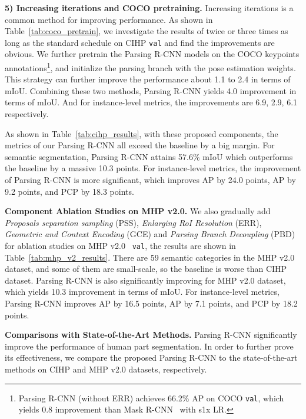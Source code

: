 \documentclass[10pt,twocolumn,letterpaper]{article}
\begin{document}
\vspace{3pt}
\noindent\textbf{5) Increasing iterations and COCO pretraining.} Increasing iterations is a common method for improving performance. As shown in Table~\ref{tab:coco_pretrain}, we investigate the results of twice or three times as long as the standard schedule on CIHP \texttt{val} and find the improvements are obvious. We further pretrain the Parsing R-CNN models on the COCO keypoints annotations\footnote{\fontsize{7pt}{1em}Parsing R-CNN (without ERR) achieves 66.2\% AP on COCO \texttt{val}, which yields 0.8 improvement than Mask R-CNN~\cite{He_iccv2017_maskrcnn} with s1x LR.}, and initialize the parsing branch with the pose estimation weights. This strategy can further improve the performance about 1.1 to 2.4 in terms of mIoU. Combining these two methods, Parsing R-CNN yields 4.0 improvement in terms of mIoU. And for instance-level metrics, the improvements are 6.9, 2.9, 6.1 respectively.

As shown in Table~\ref{tab:cihp_results}, with these proposed components, the metrics of our Parsing R-CNN all exceed the baseline by a big margin. For semantic segmentation, Parsing R-CNN attains 57.6\% mIoU which outperforms the baseline by a massive 10.3 points. For instance-level metrics, the improvement of Parsing R-CNN is more significant, which improves AP by 24.0 points,  AP by 9.2 points, and PCP by 18.3 points.


\vspace{6pt}
\noindent\textbf{Component Ablation Studies on MHP v2.0.} We also gradually add \emph{Proposals separation sampling} (PSS), \emph{Enlarging RoI Resolution} (ERR), \emph{Geometric and Context Encoding} (GCE) and \emph{Parsing Branch Decoupling} (PBD) for ablation studies on MHP v2.0~\cite{Zhao_mm2018_mhpv2} \texttt{val}, the results are shown in Table~\ref{tab:mhp_v2_results}. There are 59 semantic categories in the MHP v2.0 dataset, and some of them are small-scale, so the baseline is worse than CIHP dataset. Parsing R-CNN is also significantly improving for MHP v2.0 dataset, which yields 10.3 improvement in terms of mIoU. For instance-level metrics, Parsing R-CNN improves AP by 16.5 points,  AP by 7.1 points, and PCP by 18.2 points.


\vspace{6pt}
\noindent\textbf{Comparisons with State-of-the-Art Methods.} Parsing R-CNN significantly improve the performance of human part segmentation. In order to further prove its effectiveness, we compare the proposed Parsing R-CNN to the state-of-the-art methods on CIHP and MHP v2.0 datasets, respectively.
\end{document}
